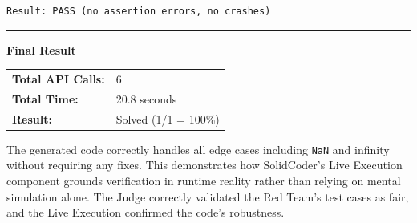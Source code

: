 \documentclass[11pt]{article}
\begin{document}
\begin{tcolorbox}[breakable, colback=white, colframe=black!70, boxrule=0.5pt, arc=2pt, left=4mm, right=4mm, top=3mm, bottom=3mm]
\begin{verbatim}
Result: PASS (no assertion errors, no crashes)
\end{verbatim}

\vspace{0.5cm} \hrule \vspace{0.5cm}

\noindent\textbf{\Large Final Result}

\begin{center}
\end{center}

\vspace{3mm}

\begin{tabular}{ll}
\textbf{Total API Calls:} & 6 \\
\textbf{Total Time:} & 20.8 seconds \\
\textbf{Result:} & Solved (1/1 = 100\%) \\
\end{tabular}

\vspace{5mm}

The generated code correctly handles all edge cases including \texttt{NaN} and infinity without requiring any fixes. This demonstrates how SolidCoder's Live Execution component grounds verification in runtime reality rather than relying on mental simulation alone. The Judge correctly validated the Red Team's test cases as fair, and the Live Execution confirmed the code's robustness.

\end{tcolorbox}
\end{document}
